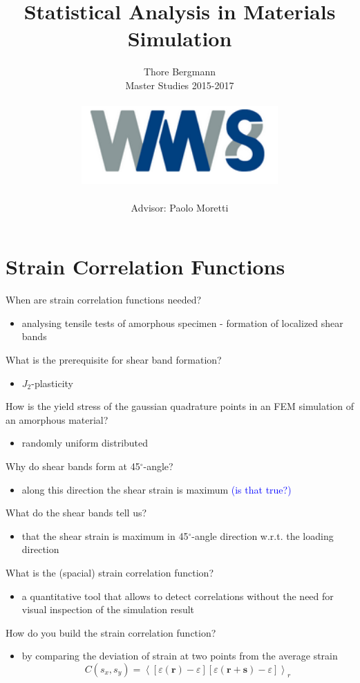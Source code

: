 \documentclass[english]{scrartcl}
\title{Statistical Analysis in Materials Simulation}
\date{Thore Bergmann \\
	Master Studies 2015-2017 \\
	$ {\;} $ \\
	\includegraphics*[height = 3cm]{logo} \\
	$ {\;} $ \\
	Advisor: Paolo Moretti}
\renewcommand{\vec}[1]{\boldsymbol{#1}}
\newenvironment{myitemize}{ \begin{itemize}
		\setlength{\itemsep}{0pt}
		\setlength{\parskip}{0pt}
		\setlength{\parsep}{0pt}     }
	{ \end{itemize}                  }
\begin{document}
	

\maketitle
\clearpage

\section*{Strain Correlation Functions}

When are strain correlation functions needed?
\begin{myitemize}
	\item analysing tensile tests of amorphous specimen
	\subitem - formation of localized shear bands
\end{myitemize}

What is the prerequisite for shear band formation?
\begin{myitemize}
	\item $ J_{2} $-plasticity
\end{myitemize}

How is the yield stress of the gaussian quadrature points in an FEM simulation of an amorphous material?
\begin{myitemize}
	\item randomly uniform distributed
\end{myitemize}

Why do shear bands form at 45$ ^{\circ} $-angle?
\begin{myitemize}
	\item along this direction the shear strain is maximum \textcolor{blue}{(is that true?)}
\end{myitemize}

What do the shear bands tell us?
\begin{myitemize}
	\item that the shear strain is maximum in 45$ ^{\circ} $-angle direction w.r.t. the loading direction
\end{myitemize}

What is the (spacial) strain correlation function?
\begin{myitemize}
	\item a quantitative tool that allows to detect correlations without the need for visual inspection of the simulation result
\end{myitemize}

How do you build the strain correlation function?
\begin{myitemize}
	\item by comparing the deviation of strain at two points from the average strain
	\begin{equation*}
		C(s_{x}, s_{y}) = \left < [\varepsilon(\vec{r}) - \varepsilon ] [\varepsilon(\vec{r+\vec{s}}) - \varepsilon ] \right >_{r}
	\end{equation*}
\end{myitemize}
\end{document}
